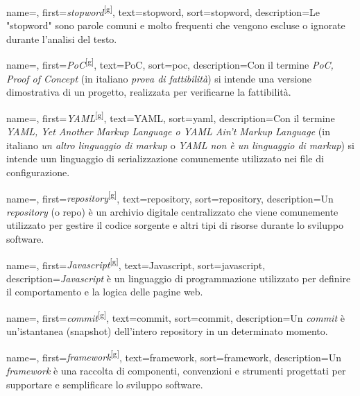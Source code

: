  {
    name=,
    first={\textit{stopword}\textsuperscript{[g]}},
    text=stopword,
    sort=stopword,
    description={Le "stopword" sono parole comuni e molto frequenti che vengono escluse o ignorate durante l’analisi del testo.}
}

 {
    name=,
    first={\textit{PoC}\textsuperscript{[g]}},
    text=PoC,
    sort=poc,
    description={Con il termine \textit{PoC, Proof of Concept} (in italiano \textit{prova di fattibilità}) si intende una versione dimostrativa di un progetto, realizzata per verificarne la fattibilità.}
}

 {
    name=,
    first={\textit{YAML}\textsuperscript{[g]}},
    text=YAML,
    sort=yaml,
    description={Con il termine \textit{YAML, Yet Another Markup Language o YAML Ain’t Markup Language} (in italiano \textit{un altro linguaggio di markup} o \textit{YAML non è un linguaggio di markup}) si intende uun linguaggio di serializzazione comunemente utilizzato nei file di configurazione.}
}

 {
    name=,
    first={\textit{repository}\textsuperscript{[g]}},
    text=repository,
    sort=repository,
    description={Un \textit{repository} (o repo) è un archivio digitale centralizzato che viene comunemente utilizzato per gestire il codice sorgente e altri tipi di risorse durante lo sviluppo software.}
}

 {
    name=,
    first={\textit{Javascript}\textsuperscript{[g]}},
    text=Javascript,
    sort=javascript,
    description={\textit{Javascript} è un linguaggio di programmazione utilizzato per definire il comportamento e la logica delle pagine web.}
}

 {
    name=,
    first={\textit{commit}\textsuperscript{[g]}},
    text=commit,
    sort=commit,
    description={Un \textit{commit} è un'istantanea (snapshot) dell’intero repository in un determinato momento.}
}

 {
    name=,
    first={\textit{framework}\textsuperscript{[g]}},
    text=framework,
    sort=framework,
    description={Un \textit{framework} è una raccolta di componenti, convenzioni e strumenti progettati per supportare e semplificare lo sviluppo software.}
}

